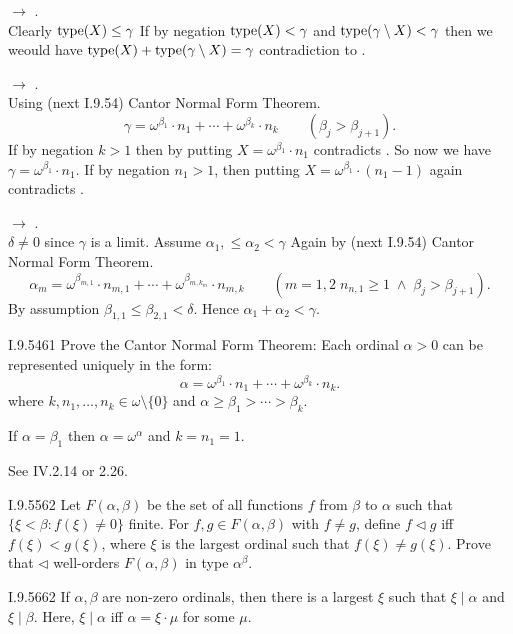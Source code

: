  \(\rightarrow\) .\\
Clearly \(\mathop{\mathrm{type}}(X) \leq \gamma\)
If by negation \(\mathop{\mathrm{type}}(X)<\gamma\)
and \(\mathop{\mathrm{type}}(\gamma\setminus X)<\gamma\)
then we weould have \(\mathop{\mathrm{type}}(X) + \mathop{\mathrm{type}}(\gamma\setminus X) = \gamma\)
contradiction to .

 \(\rightarrow\) .\\
Using (next I.9.54) Cantor Normal Form Theorem.
\begin{equation*}
\gamma = \omega^{\beta_1}\cdot n_1 + \cdots + \omega^{\beta_k}\cdot n_k
\qquad (\beta_j > \beta_{j+1}).
\end{equation*}
If by negation \(k > 1\) then by putting \(X =  \omega^{\beta_1}\cdot n_1\)
contradicts . So now we have \(\gamma = \omega^{\beta_1}\cdot n_1\).
If by negation \(n_1 > 1\), then putting \(X =  \omega^{\beta_1}\cdot (n_1 - 1)\)
again contradicts .

 \(\rightarrow\) .\\
\(\delta \neq 0\) since \(\gamma\) is a limit.
Assume \(\alpha_1, \leq \alpha_2 < \gamma\)
Again by (next I.9.54) Cantor Normal Form Theorem.
\begin{equation*}
\alpha_m = \omega^{\beta_{m,1}}\cdot n_{m,1} + \cdots + \omega^{\beta_{m,k_m}}\cdot n_{m,k}
\qquad (m=1,2\;n_{n,1}\geq 1\;\land\;\beta_j > \beta_{j+1}).
\end{equation*}
By assumption \(\beta_{1,1} \leq \beta_{2,1} < \delta\).
Hence \(\alpha_1 + \alpha_2 < \gamma\).

\begin{lexcopy}{I.9.54}{61}
Prove the Cantor Normal Form Theorem: Each ordinal
\(\alpha > 0\) can be represented uniquely in the form:
\begin{equation*}
\alpha =\omega^{\beta_1}\cdot n_1 + \cdots + \omega^{\beta_k}\cdot n_k .
\end{equation*}
where \(k,n_1,\ldots,n_k \in \omega \setminus \{0\}\)
and
\(\alpha \geq \beta_1 > \cdots > \beta_k\).

If \(\alpha = \beta_1\) then \(\alpha = \omega^\alpha\) and \(k = n_1 = 1\).
\end{lexcopy}

See \cite{Levy2002Basic} IV.2.14 or \cite{Jech2006Set} 2.26.
\unfinished

\begin{lexcopy}{I.9.55}{62}
Let \(F(\alpha, \beta)\) be the set of all functions $f$ from
\(\beta\) to \(\alpha\) such
that \(\{\xi < \beta: f(\xi) \neq 0\}\) finite.
For \(f,g \in F(\alpha,\beta)\) with \(f \neq g\), define \(f \triangleleft g\)
iff \(f(\xi) < g(\xi)\), where \(\xi\) is the largest ordinal such
that \(f(\xi) \neq g(\xi)\). Prove that
\(\triangleleft\) well-orders \(F(\alpha, \beta)\) in type \(\alpha^\beta\).
\end{lexcopy}
\unfinished

\begin{lexcopy}{I.9.56}{62}
If \(\alpha,\beta\) are non-zero ordinals, then there is a largest \(\xi\) such
that \(\xi \mid \alpha\) and \(\xi \mid \beta\).
Here, \(\xi \mid \alpha\) iff \(\alpha = \xi\cdot\mu\) for some \(\mu\).
\end{lexcopy}
\unfinished

